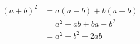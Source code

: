 \begin{equation} 
  \label{perfect-square}
  \begin{split}
  (a+b)^2 & = a(a+b)+b(a+b) \\
          & = a^2+ab+ba+b^2 \\
          & = a^2+b^2+2ab
  \end{split}
\end{equation}